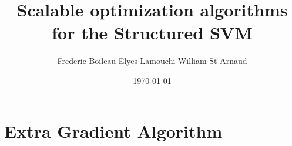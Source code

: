 
\title{Scalable optimization algorithms for the Structured SVM}
\date{\today}
\author{Frederic Boileau Elyes Lamouchi William St-Arnaud}

\maketitle

\section{Extra Gradient Algorithm}




